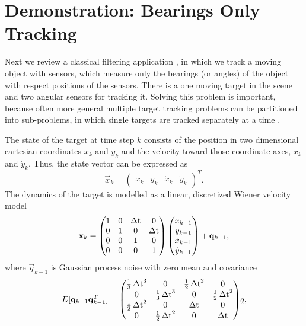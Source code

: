 \clearpage
\section{Demonstration: Bearings Only Tracking}

Next we review a classical filtering application \citep[see, e.g.,][]{Bar-Shalom+Li+Kirubarajan:2001}, in which we track a moving object with
sensors, which measure only the bearings (or angles) of the object
with respect positions of the sensors. There is a one moving target in
the scene and two angular sensors for tracking it. Solving this
problem is important, because often more general multiple target
tracking problems can be partitioned into sub-problems, in which
single targets are tracked separately at a time \citep{Sarkka+Vehtari+Lampinen:2007}.

The state of the target at time step $k$ consists of the position in
two dimensional cartesian coordinates $x_k$ and $y_k$ and the velocity
toward those coordinate axes, $\dot{x}_k$ and $\dot{y}_k$. Thus, the
state vector can be expressed as
%
\begin{equation}
%
\vec{x}_k =
\begin{pmatrix} x_k & y_k & \dot{x}_k & \dot{y}_k
\end{pmatrix}^T.
%
\end{equation}
%
The dynamics of the target is modelled as a linear, discretized Wiener
velocity model \citep{Bar-Shalom+Li+Kirubarajan:2001}
%
\begin{equation}
%
\vec{x}_k = \begin{pmatrix} 1 & 0 & \dt & 0 \\ 0 & 1 & 0 & \dt \\ 0 &
0 & 1 & 0 \\ 0 & 0 & 0 & 1
\end{pmatrix} %
\begin{pmatrix} x_{k-1} \\ y_{k-1} \\ \dot{x}_{k-1} \\ \dot{y}_{k-1}
\end{pmatrix} + \vec{q}_{k-1},
%
\end{equation}
% 
where $\vec{q}_{k-1}$ is Gaussian process noise with zero mean and
covariance
%
\begin{equation}
\begin{split} E[\mathbf{q}_{k-1}\mathbf{q}^T_{k-1}] = \begin{pmatrix}
\frac{1}{3}\operatorname{\Delta t}^3 & 0 & \frac{1}{2}\operatorname{\Delta t}^2 & 0 \\ 0 & \frac{1}{3}\operatorname{\Delta t}^3 &
0 & \frac{1}{2}\operatorname{\Delta t}^2 \\ \frac{1}{2}\operatorname{\Delta t}^2 & 0 & \operatorname{\Delta t} & 0 \\ 0 &
\frac{1}{2}\operatorname{\Delta t}^2 & 0 & \operatorname{\Delta t}
\end{pmatrix} \\
\end{split}q,
\end{equation}
